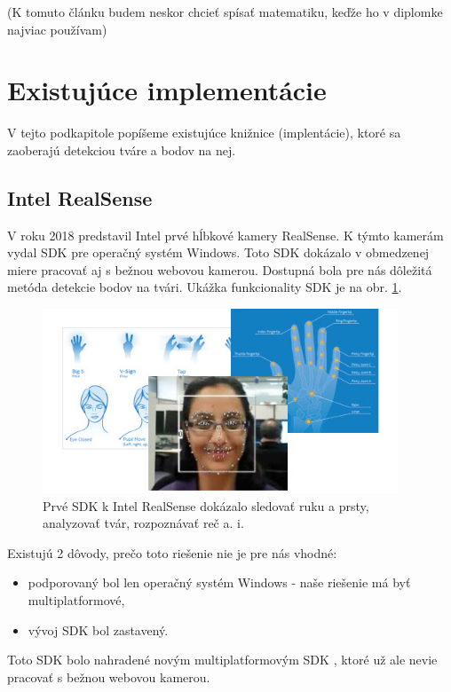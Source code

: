 (K tomuto článku budem neskor chcieť spísať matematiku, keďže ho v diplomke najviac používam)

\section{Existujúce implementácie}
V tejto podkapitole popíšeme existujúce knižnice (implentácie), ktoré sa zaoberajú detekciou tváre a bodov na nej.

\subsection{Intel RealSense}
V roku 2018 predstavil Intel prvé hĺbkové kamery RealSense.
K týmto kamerám vydal SDK \cite{realsensedis} pre operačný systém Windows. 
Toto SDK dokázalo v obmedzenej miere pracovať aj s bežnou webovou kamerou. 
Dostupná bola pre nás dôležitá metóda detekcie bodov na tvári. 
Ukážka funkcionality SDK je na obr. \ref{pic-realsensedis}.

\begin{figure}[H]
	\begin{center}
		\includegraphics[height=5.5cm]{pics/realsensedis.jpg}
		\caption{Prvé SDK k Intel RealSense dokázalo sledovať ruku a prsty, analyzovať tvár, rozpoznávať reč a. i.
		 \cite{realsensedis}}
		\label{pic-realsensedis}
	\end{center}
\end{figure}

Existujú 2 dôvody, prečo toto riešenie nie je pre nás vhodné: 
\begin{itemize}
	\item podporovaný bol len operačný systém Windows - naše riešenie má byť multiplatformové,
	\item vývoj SDK bol zastavený.
\end{itemize}
Toto SDK bolo nahradené novým multiplatformovým SDK \cite{realsensenew}, ktoré už ale nevie pracovať s bežnou webovou kamerou. 

